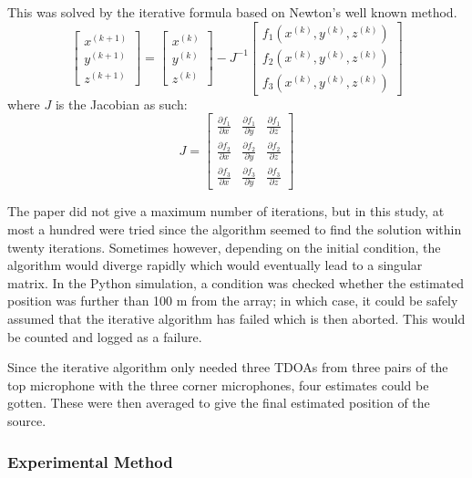 \documentclass[notitlepage]{report}
\begin{document}
This was solved by the iterative formula based on Newton's well known method.
\begin{equation}
\begin{bmatrix}
	x^{(k+1)} \\
	y^{(k+1)} \\
	z^{(k+1)}
\end{bmatrix}
=
\begin{bmatrix}
	x^{(k)} \\
	y^{(k)} \\
	z^{(k)}
\end{bmatrix}
-
J^{-1}
\begin{bmatrix}
	f_1\left(x^{(k)}, y^{(k)}, z^{(k)}\right) \\
	f_2\left(x^{(k)}, y^{(k)}, z^{(k)}\right) \\
	f_3\left(x^{(k)}, y^{(k)}, z^{(k)}\right)
\end{bmatrix}
\end{equation}
where $J$ is the Jacobian as such:
\begin{equation}
J = 
\begin{bmatrix}
\frac{\partial f_1}{\partial x}
& \frac{\partial f_1}{\partial y}
& \frac{\partial f_1}{\partial z} \\
\frac{\partial f_2}{\partial x}
& \frac{\partial f_2}{\partial y}
& \frac{\partial f_2}{\partial z} \\
\frac{\partial f_3}{\partial x}
& \frac{\partial f_3}{\partial y}
& \frac{\partial f_3}{\partial z}
\end{bmatrix}
\end{equation}

The paper did not give a maximum number of iterations, but in this study, at most a hundred were tried since the algorithm seemed to find the solution within twenty iterations. Sometimes however, depending on the initial condition, the algorithm would diverge rapidly which would eventually lead to a singular matrix. In the Python simulation, a condition was checked whether the estimated position was further than 100 \si{m} from the array; in which case, it could be safely assumed that the iterative algorithm has failed which is then aborted. This would be counted and logged as a failure.

Since the iterative algorithm only needed three TDOAs from three pairs of the top microphone with the three corner microphones, four estimates could be gotten. These were then averaged to give the final estimated position of the source.

\subsubsection{Experimental Method}
\end{document}
